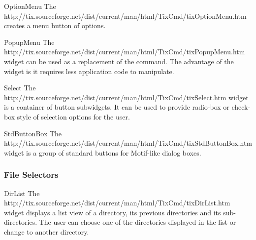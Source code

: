 
\begin{classdesc}{OptionMenu}{}
The 
{http://tix.sourceforge.net/dist/current/man/html/TixCmd/tixOptionMenu.htm}
creates a menu button of options.
\end{classdesc}


\begin{classdesc}{PopupMenu}{}
The 
{http://tix.sourceforge.net/dist/current/man/html/TixCmd/tixPopupMenu.htm}
widget can be used as a replacement of the 
command. The advantage of the   widget
is it requires less application code to manipulate.
\end{classdesc}


\begin{classdesc}{Select}{}
The 
{http://tix.sourceforge.net/dist/current/man/html/TixCmd/tixSelect.htm}
widget is a container of button subwidgets. It can be used to provide
radio-box or check-box style of selection options for the user.
\end{classdesc}


\begin{classdesc}{StdButtonBox}{}
The 
{http://tix.sourceforge.net/dist/current/man/html/TixCmd/tixStdButtonBox.htm}
widget is a group of standard buttons for Motif-like dialog boxes.
\end{classdesc}



\subsubsection{File Selectors}

\begin{classdesc}{DirList}{}
The 
{http://tix.sourceforge.net/dist/current/man/html/TixCmd/tixDirList.htm} widget
displays a list view of a directory, its previous directories and its
sub-directories. The user can choose one of the directories displayed
in the list or change to another directory.
\end{classdesc}


